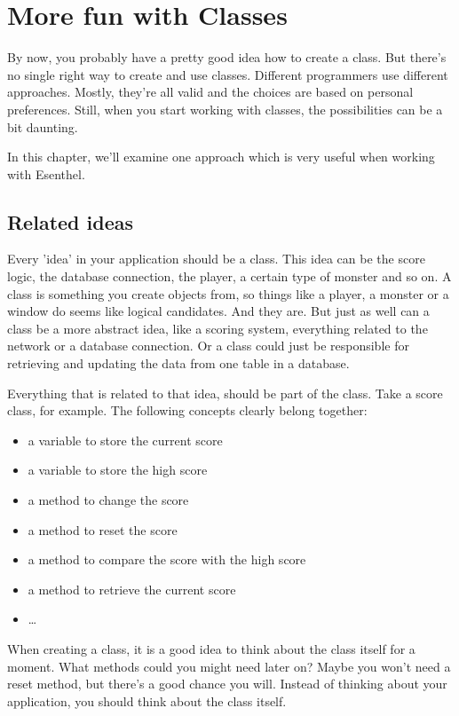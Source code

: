 \chapter{More fun with Classes}

By now, you probably have a pretty good idea how to create a class. But there's no single right way to create and use classes. Different programmers use different approaches. Mostly, they're all valid and the choices are based on personal preferences. Still, when you start working with classes, the possibilities can be a bit daunting.

In this chapter, we'll examine one approach which is very useful when working with Esenthel.  

\section{Related ideas}

Every 'idea' in your application should be a class. This idea can be the score logic, the database connection, the player, a certain type of monster and so on. A class is something you create objects from, so things like a player, a monster or a window do seems like logical candidates. And they are. But just as well can a class be a more abstract idea, like a scoring system, everything related to the network or a database connection. Or a class could just be responsible for retrieving and updating the data from one table in a database. 

Everything that is related to that idea, should be part of the class. Take a score class, for example. The following concepts clearly belong together: 

\begin{itemize}
\item a variable to store the current score
\item a variable to store the high score
\item a method to change the score
\item a method to reset the score
\item a method to compare the score with the high score
\item a method to retrieve the current score
\item \ldots
\end{itemize}

When creating a class, it is a good idea to think about the class itself for a moment. What methods could you might need later on? Maybe you won't need a reset method, but there's a good chance you will. Instead of thinking about your application, you should think about the class itself.


